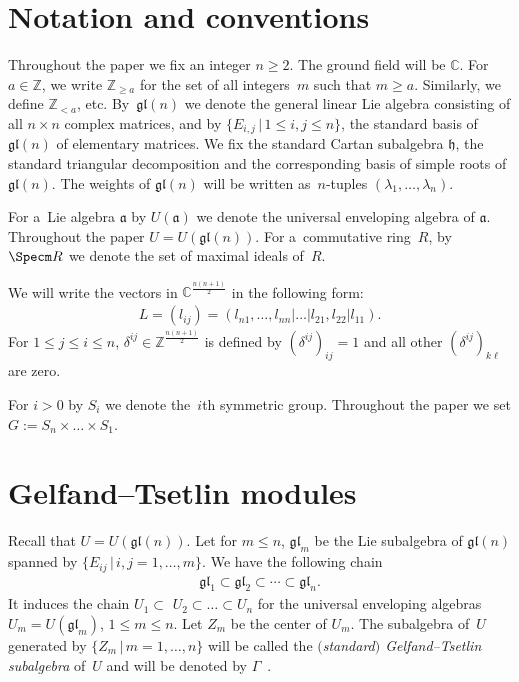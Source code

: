 \section{Notation and conventions}

Throughout the paper we f\/ix an integer $n\geq 2$.
The ground f\/ield will be ${\mathbb C}$.
For $a \in {\mathbb Z}$, we write $\mathbb Z_{\geq a}$ for the set of all integers~$m$ such that $m \geq a$.
Similarly, we def\/ine $\mathbb Z_{< a}$, etc.
By~$\mathfrak{gl}(n)$ we denote the general linear Lie algebra consisting
of all $n\times n$ complex matrices, and by $\{E_{i,j}\,|\, 1\leq i,j \leq n\}$,
the standard basis of $\mathfrak{gl}(n)$ of elementary matrices.
We f\/ix the standard Cartan subalgebra $\mathfrak h$, the standard triangular decomposition and the corresponding basis
of simple roots of $\mathfrak{gl}(n)$.
The weights of $\mathfrak{gl}(n)$ will be written as~$n$-tuples $(\lambda_1,\dots,\lambda_n)$.

For a~Lie algebra ${\mathfrak a}$ by $U(\mathfrak a)$ we denote the universal enveloping algebra of ${\mathfrak a}$.
Throughout the paper $U = U(\mathfrak{gl} (n))$.
For a~commutative ring~$R$, by $\Specm R$ we denote the set of maximal ideals of~$R$.

We will write the vectors in $\mathbb{C}^{\frac{n(n+1)}{2}}$ in the following form:
\begin{gather*}
L=(l_{ij})=(l_{n1},\dots,l_{nn}| \dots|l_{21}, l_{22}|l_{11}).
\end{gather*}
For $1\leq j \leq i \leq n$, $\delta^{ij} \in {\mathbb Z}^{\frac{n(n+1)}{2}}$ is def\/ined by $(\delta^{ij})_{ij}=1$ and
all other $(\delta^{ij})_{k\ell}$ are zero.

For $i>0$ by $S_i$ we denote the~$i$th symmetric group.
Throughout the paper we set $G:=S_n\times\dots \times S_1$.

\section{Gelfand--Tsetlin modules}
\label{section3}

Recall that $U=U(\mathfrak{gl} (n))$.
Let for $m\leqslant n$, $\mathfrak{gl}_{m}$ be the Lie subalgebra of $\mathfrak{gl} (n)$ spanned by $\{E_{ij} \,|\,
i,j=1,\ldots,m \}$.
We have the following chain
\begin{gather*}
\mathfrak{gl}_1\subset \mathfrak{gl}_2\subset \cdots \subset \mathfrak{gl}_n.
\end{gather*}
It induces the chain $U_1\subset$ $U_2\subset \dots \subset U_n$ for the universal enveloping algebras
$U_{m}=U(\mathfrak{gl}_{m})$, $1\leq m\leq n$.
Let $Z_{m}$ be the center of $U_{m}$.
The subalgebra of~$U$ generated by $\{Z_m \,|\, m=1,\ldots, n \}$ will be called the \emph{$($standard$)$ Gelfand--Tsetlin
subalgebra} of~$U$ and will be denoted by ${{\Gamma}}$~\cite{DFO3}.

